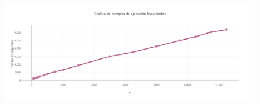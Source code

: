    \begin{figure}[h!]
   \begin{center}
 	\includegraphics[scale=1.7]{imagenes/ej2/grafiquitos/graf3.png}
   \end{center}
 \end{figure}